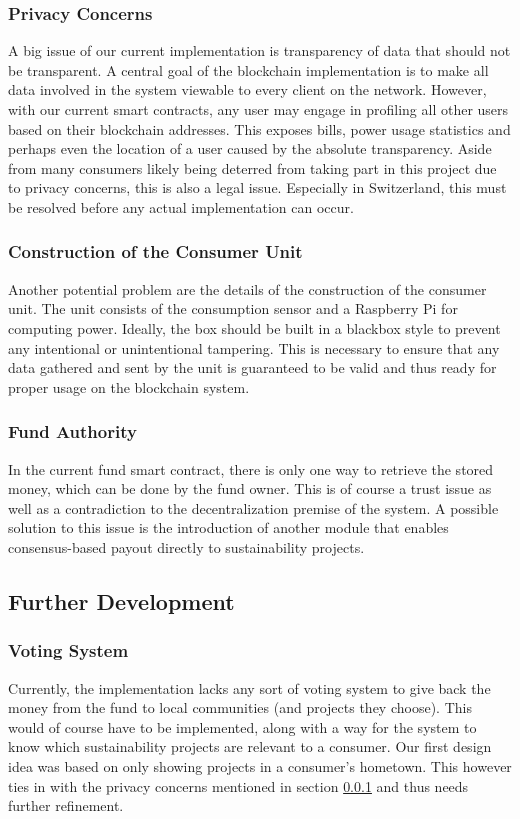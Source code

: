 \documentclass[11pt]{article}
\begin{document}
\subsubsection{Privacy Concerns} \label{subsec:privacy}
A big issue of our current implementation is transparency of data that should not be transparent. A central goal of the blockchain implementation is to make all data involved in the system viewable to every client on the network. However, with our current smart contracts, any user may engage in profiling all other users based on their blockchain addresses. This exposes bills, power usage statistics and perhaps even the location of a user caused by the absolute transparency. Aside from many consumers likely being deterred from taking part in this project due to privacy concerns, this is also a legal issue. Especially in Switzerland, this must be resolved before any actual implementation can occur.
\subsubsection{Construction of the Consumer Unit}
Another potential problem are the details of the construction of the consumer unit. The unit consists of the consumption sensor and a Raspberry Pi for computing power. Ideally, the box should be built in a blackbox style to prevent any intentional or unintentional tampering. This is necessary to ensure that any data gathered and sent by the unit is guaranteed to be valid and thus ready for proper usage on the blockchain system.
\subsubsection{Fund Authority}
In the current fund smart contract, there is only one way to retrieve the stored money, which can be done by the fund owner. This is of course a trust issue as well as a contradiction to the decentralization premise of the system. A possible solution to this issue is the introduction of another module that enables consensus-based payout directly to sustainability projects.

\subsection{Further Development}
\subsubsection{Voting System}
Currently, the implementation lacks any sort of voting system to give back the money from the fund to local communities (and projects they choose). This would of course have to be implemented, along with a way for the system to know which sustainability projects are relevant to a consumer. Our first design idea was based on only showing projects in a consumer's hometown. This however ties in with the privacy concerns mentioned in section \ref{subsec:privacy} and thus needs further refinement. 
\end{document}
